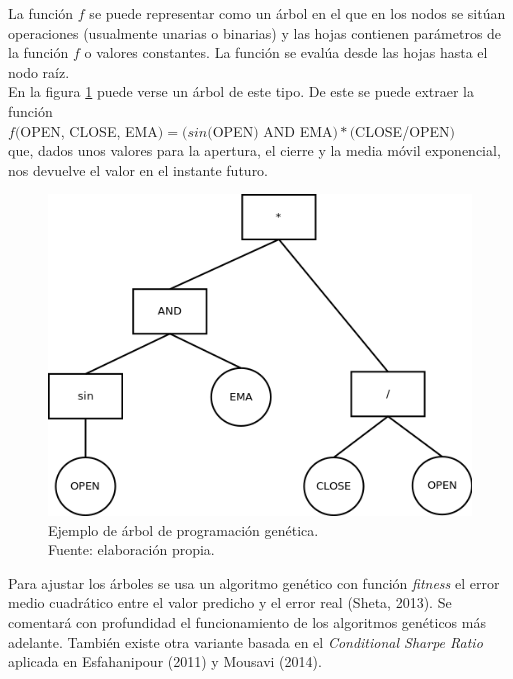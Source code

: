     La funci\'on $f$ se puede representar como un \'arbol en el que en los nodos se sit\'uan operaciones (usualmente unarias o binarias) y las hojas contienen par\'ametros de la funci\'on $f$ o valores constantes. La funci\'on se eval\'ua desde las hojas hasta el nodo ra\'iz. \\
   
       
    En la figura \ref{fig:inf_compl} puede verse un \'arbol de este tipo. De este se puede extraer la funci\'on \\
    $f($OPEN, CLOSE, EMA$) = (sin($OPEN$)$ AND EMA$) * ($CLOSE/OPEN$)$\\ que, dados unos valores para la apertura, el cierre y la media m\'ovil exponencial, nos devuelve el valor en el instante futuro.\\
    
	\begin{figure}[H]
		\centering
    	\includegraphics[scale=0.5]{imagenes/arbol_inf_comp.png}
    	\caption[Ejemplo de \'arbol de programaci\'on gen\'etica]{Ejemplo de \'arbol de programaci\'on gen\'etica.\\ Fuente: elaboraci\'on propia.}
    	\label{fig:inf_compl}
    \end{figure}

    
    Para ajustar los \'arboles se usa un algoritmo gen\'etico con funci\'on \textit{fitness} el error medio cuadr\'atico entre el valor predicho y el error real (Sheta, 2013). Se comentar\'a con profundidad el funcionamiento de los algoritmos gen\'eticos m\'as adelante. Tambi\'en existe otra variante basada en el \textit{Conditional Sharpe Ratio} aplicada en Esfahanipour (2011) y Mousavi (2014).\\
    
